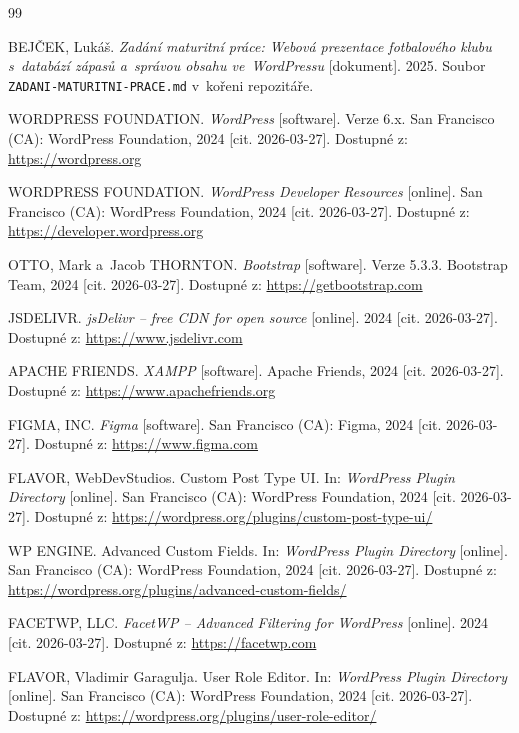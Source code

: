 \documentclass[12pt,a4paper]{article}
\begin{document}
\newpage
{}
{}
\begin{thebibliography}{99}

BEJČEK, Lukáš. \textit{Zadání maturitní práce: Webová prezentace fotbalového klubu s~databází zápasů a~správou obsahu ve~WordPressu} [dokument]. 2025. Soubor \texttt{ZADANI-MATURITNI-PRACE.md} v~kořeni repozitáře.

WORDPRESS FOUNDATION. \textit{WordPress} [software]. Verze 6.x. San Francisco (CA): WordPress Foundation, 2024 [cit. 2026-03-27]. Dostupné z: \url{https://wordpress.org}

WORDPRESS FOUNDATION. \textit{WordPress Developer Resources} [online]. San Francisco (CA): WordPress Foundation, 2024 [cit. 2026-03-27]. Dostupné z: \url{https://developer.wordpress.org}

OTTO, Mark a~Jacob THORNTON. \textit{Bootstrap} [software]. Verze 5.3.3. Bootstrap Team, 2024 [cit. 2026-03-27]. Dostupné z: \url{https://getbootstrap.com}

JSDELIVR. \textit{jsDelivr -- free CDN for open source} [online]. 2024 [cit. 2026-03-27]. Dostupné z: \url{https://www.jsdelivr.com}

APACHE FRIENDS. \textit{XAMPP} [software]. Apache Friends, 2024 [cit. 2026-03-27]. Dostupné z: \url{https://www.apachefriends.org}

FIGMA, INC. \textit{Figma} [software]. San Francisco (CA): Figma, 2024 [cit. 2026-03-27]. Dostupné z: \url{https://www.figma.com}

FLAVOR, WebDevStudios. Custom Post Type UI. In: \textit{WordPress Plugin Directory} [online]. San Francisco (CA): WordPress Foundation, 2024 [cit. 2026-03-27]. Dostupné z: \url{https://wordpress.org/plugins/custom-post-type-ui/}

WP ENGINE. Advanced Custom Fields. In: \textit{WordPress Plugin Directory} [online]. San Francisco (CA): WordPress Foundation, 2024 [cit. 2026-03-27]. Dostupné z: \url{https://wordpress.org/plugins/advanced-custom-fields/}

FACETWP, LLC. \textit{FacetWP -- Advanced Filtering for WordPress} [online]. 2024 [cit. 2026-03-27]. Dostupné z: \url{https://facetwp.com}

FLAVOR, Vladimir Garagulja. User Role Editor. In: \textit{WordPress Plugin Directory} [online]. San Francisco (CA): WordPress Foundation, 2024 [cit. 2026-03-27]. Dostupné z: \url{https://wordpress.org/plugins/user-role-editor/}


\end{thebibliography}
\end{document}
